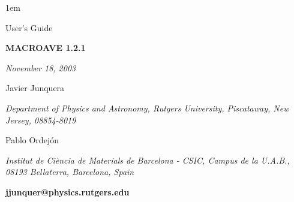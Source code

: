 %
%



\textheight 22cm
\textwidth 16cm
\oddsidemargin 1mm
\topmargin -15mm

\baselineskip=14pt
\parskip 5pt
\parindent 1em




\begin{titlepage}

\begin{center}

\vspace{1cm}

{\huge {\sc User's Guide}}

\vspace{4cm}

{\Huge {\bf MACROAVE 1.2.1} }

\vspace{3cm}

{\Large {\it November 18, 2003} }

\vspace{3cm}

{\Large Javier Junquera}

\vspace{5pt}

{\it Department of Physics and Astronomy, Rutgers University,
              Piscataway, New Jersey, 08854-8019}

\vspace{7mm}

{\Large Pablo Ordej\'on}

\vspace{5pt}

{\it Institut de Ci\`encia de Materials de Barcelona - CSIC,
Campus de la U.A.B.,
08193 Bellaterra, Barcelona, Spain}

\vspace{3cm}
{\bf jjunquer@physics.rutgers.edu}

\end{center}

\end{titlepage}


